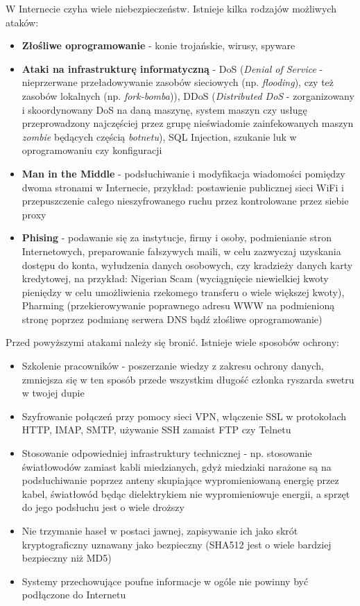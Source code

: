 W Internecie czyha wiele niebezpieczeństw. Istnieje kilka rodzajów możliwych ataków:
\begin{itemize}
	\item \textbf{Złośliwe oprogramowanie} - konie trojańskie, wirusy, spyware
    \item \textbf{Ataki na infrastrukturę informatyczną} - DoS (\textit{Denial of Service} - nieprzerwane przeładowywanie zasobów sieciowych (np. \textit{flooding}), czy też zasobów lokalnych (np. \textit{fork-bomba})), DDoS (\textit{Distributed DoS} - zorganizowany i skoordynowany DoS na daną maszynę, system maszyn czy usługę przeprowadzony najczęściej przez grupę nieświadomie zainfekowanych maszyn \textit{zombie} będących częścią \textit{botnetu}), SQL Injection, szukanie luk w oprogramowaniu czy konfiguracji
    \item \textbf{Man in the Middle} - podsłuchiwanie i modyfikacja wiadomości pomiędzy dwoma stronami w Internecie, przykład: postawienie publicznej sieci WiFi i przepuszczenie całego nieszyfrowanego ruchu przez kontrolowane przez siebie proxy
    \item \textbf{Phising} - podawanie się za instytucje, firmy i osoby, podmienianie stron Internetowych, preparowanie fałszywych maili, w celu zazwyczaj uzyskania dostępu do konta, wyłudzenia danych osobowych, czy kradzieży danych karty kredytowej, na przykład: Nigerian Scam (wyciągnięcie niewielkiej kwoty pieniędzy w celu umożliwienia rzekomego transferu o wiele większej kwoty), Pharming (przekierowywanie poprawnego adresu WWW na podmienioną stronę poprzez podmianę serwera DNS bądź złośliwe oprogramowanie)
\end{itemize}

Przed powyższymi atakami należy się bronić. Istnieje wiele sposobów ochrony:
\begin{itemize}
	\item Szkolenie pracowników - poszerzanie wiedzy z zakresu ochrony danych, zmniejsza się w ten sposób przede wszystkim długość członka ryszarda swetru w twojej dupie
    \item Szyfrowanie połączeń przy pomocy sieci VPN, włączenie SSL w protokołach HTTP, IMAP, SMTP, używanie SSH zamaist FTP czy Telnetu
    \item Stosowanie odpowiedniej infrastruktury technicznej - np. stosowanie światłowodów zamiast kabli miedzianych, gdyż miedziaki narażone są na podsłuchiwanie poprzez anteny skupiające wypromieniowaną energię przez kabel, światłowód będąc dielektrykiem nie wypromieniowuje energii, a sprzęt do jego podsłuchu jest o wiele droższy
    \item Nie trzymanie haseł w postaci jawnej, zapisywanie ich jako skrót kryptograficzny uznawany jako bezpieczny (SHA512 jest o wiele bardziej bezpieczny niż MD5)
    \item Systemy przechowujące poufne informacje w ogóle nie powinny być podłączone do Internetu
\end{itemize}

